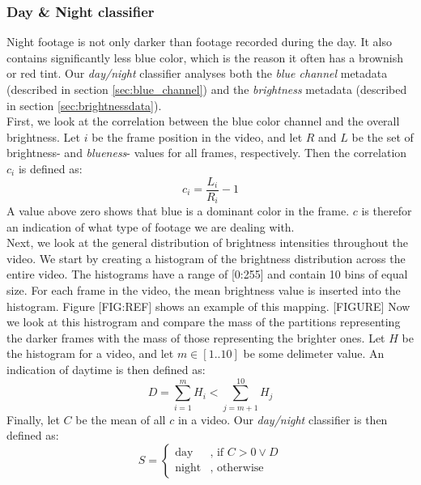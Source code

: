 \subsubsection{Day \& Night classifier}\label{sec:daynightclassifier}
%
Night footage is not only darker than footage recorded during the day. It also contains significantly less blue color, which is the reason it often has a brownish or red tint. Our \textit{day/night} classifier analyses both the \textit{blue channel} metadata (described in section \ref{sec:blue_channel}) and the \textit{brightness} metadata (described in section \ref{sec:brightnessdata}).\\
First, we look at the correlation between the blue color channel and the overall brightness. Let $i$ be the frame position in the video, and let $R$ and $L$ be the set of brightness- and \textit{blueness}- values for all frames, respectively. Then the correlation $c_{i}$ is defined as:\\
%
\begin{equation}
c_{i} = \frac{L_{i}}{R_{i}} - 1
\end{equation}
%
A value above zero shows that blue is a dominant color in the frame. $c$ is therefor an indication of what type of footage we are dealing with.\\
Next, we look at the general distribution of brightness intensities throughout the video. We start by creating a histogram of the brightness distribution across the entire video. The histograms have a range of [0:255] and contain 10 bins of equal size. For each frame in the video, the mean brightness value is inserted into the histogram. Figure [FIG:REF] shows an example of this mapping.
%
[FIGURE]
%
Now we look at this histrogram and compare the mass of the partitions representing the darker frames with the mass of those representing the brighter ones. Let $H$ be the histogram for a video, and let $m\in [1..10]$ be some delimeter value. An indication of daytime is then defined as:
%
\begin{equation}
D = \sum_{i=1}^{m}H_{i} < \sum_{j=m+1}^{10}H_{j}
\end{equation}
%
Finally, let $C$ be the mean of all $c$ in a video. Our \textit{day/night} classifier is then defined as:
\begin{equation}
S =
\begin{cases}
\text{day} & \text{, if } C > 0 \vee D \\
\text{night} &  \text{, otherwise}
\end{cases}
\end{equation}
%
